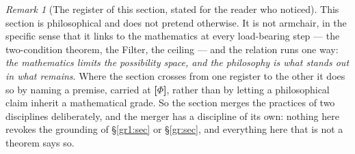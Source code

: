 \documentclass[11pt]{article}
\numberwithin{equation}{section}
\theoremstyle{plain}
\theoremstyle{definition}
\theoremstyle{remark}
\newtheorem{remark}[theorem]{Remark}
\begin{document}
%

\begin{remark}[The register of this section, stated for the reader who
noticed]\label{ac:rem:register}
This section is philosophical and does not pretend otherwise. It is not
armchair, in the specific sense that it links to the mathematics at every
load-bearing step --- the two-condition theorem, the Filter, the ceiling
--- and the relation runs one way: \emph{the mathematics limits the
possibility space, and the philosophy is what stands out in what remains}.
Where the section crosses from one register to the other it does so by
naming a premise, carried at \textbf{[$\Phi$]}, rather than by letting a
philosophical claim inherit a mathematical grade. So the section merges
the practices of two disciplines deliberately, and the merger has a
discipline of its own: nothing here revokes the grounding of
\S\ref{gr1:sec} or \S\ref{gr:sec}, and everything here that is not a
theorem says so.
\end{remark}
\end{document}
